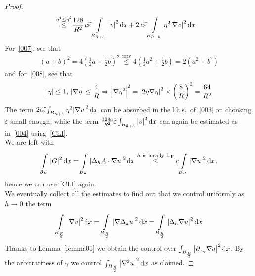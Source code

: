 \begin{proof}
\begin{align}
		\overset{\eta ^{4}\leq \eta ^{2}}{\leq}                                                                                                    & \frac{128}{R^{2}}\, c \widetilde{\varepsilon } \int\limits_{B_{R+h}}^{} \abs{v}^{2} \dd{x} + 2\,c \widetilde{\varepsilon }  \int\limits_{B_{R+h}}^{} \eta ^{2}\abs{\nabla v}^{2} \dd{x}
	\end{align}
	For~\eqref{007}, see that
	\begin{gather}
		{(a+b)}^{2}= 4{\left( \frac{1}{2}a+\frac{1}{2}b \right)} ^{2} \overset{\text{conv}}{\leq } 4 \left( \frac{1}{2}a^{2}+ \frac{1}{2}b \right) = 2(a^{2}+b^{2}) \label{007}
	\end{gather}
	and for~\eqref{008}, see that
	\begin{gather}
		\abs{\eta }\leq 1, \, \abs{\nabla \eta }\leq \frac{4}{R} \Rightarrow \abs{\nabla \eta ^{2}}^{2}=\abs{2 \eta \nabla \eta }^{2} < {\left( \frac{8}{R} \right)} ^{2} = \frac{64}{R^{2}} \label{008}
	\end{gather}
	The term \( 2 c \widetilde{\varepsilon } \int_{B_{R+h}}^{} \eta ^{2} \abs{\nabla v}^{2} \dd{x} \) can be absorbed in the l.h.s.\ of~\eqref{003} on choosing \( \widetilde{\varepsilon } \) small enough, while the term \( \frac{128c}{R^{2}} \widetilde{\varepsilon } \int_{B_{R+h}}^{} \abs{v}^{2} \dd{x} \) can again be estimated as in~\eqref{004} using~\eqref{CLI}. \\
	We are left with
	\begin{gather}
		\int\limits_{B_{R}}^{} \abs{G}^{2} \dd{x} = \int\limits_{B_{R}}^{} \abs{\Delta_{h}A \cdot \nabla u}^{2} \dd{x} \overset{\text{A is locally Lip}}{\leq } c \int\limits_{B_{R}}^{} \abs{\nabla u}^{2} \dd{x}, \label{006}
	\end{gather}
	hence we can use~\eqref{CLI} again. \\
	We eventually collect all the estimates to find out that we control uniformly as \( h \to 0 \) the term
	\begin{gather}
		\int\limits_{B_{\frac{R}{2}}}^{} \abs{\nabla v}^{2} \dd{x}	= \int\limits_{B_{\frac{R}{2}}}^{} \abs{\nabla \Delta _{h}u}^{2} \dd{x}	= \int\limits_{B_{\frac{R}{2}}}^{} \abs{\Delta _{h} \nabla u}^{2} \dd{x}
	\end{gather}
	Thanks to Lemma~\ref{lemma01} we obtain the control over \( \int_{B_{\frac{R}{2}}}^{} \abs{\partial_{x_{\gamma }}	\nabla u}^{2} \dd{x} \). By the arbitrariness of \( \gamma \) we control \( \int_{B_{\frac{R}{2}}}^{} \abs{\nabla ^{2}u}^{2} \dd{x} \) as claimed.
\end{proof}